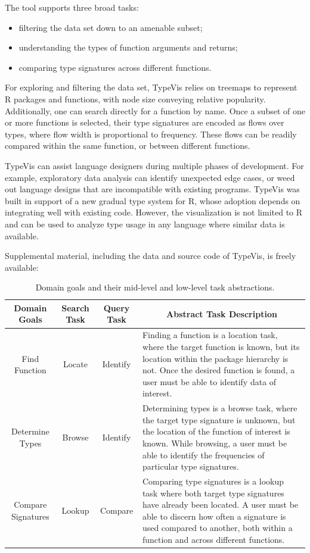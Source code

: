 \documentclass{vgtc}                          %
\newcommand{\typevis}{{\sc TypeVis}\xspace}
\begin{document}
The tool supports three broad tasks:
\begin{itemize}
  \setlength\itemsep{0em}
  \item filtering the data set down to an amenable subset;
  \item understanding the types of function arguments and returns;
  \item comparing type signatures across different functions.
\end{itemize}
For exploring and filtering the data set,
\typevis relies on treemaps to represent R packages and functions,
with node size conveying relative popularity.
Additionally, one can search directly for a function by name.
Once a subset of one or more functions is selected,
their type signatures are encoded as flows over types,
where flow width is proportional to frequency.
These flows can be readily compared within the same function,
or between different functions.

\typevis can assist language designers during multiple phases of development.
For example, exploratory data analysis can identify unexpected edge cases,
or weed out language designs that are incompatible with existing programs.
\typevis was built in support of a new gradual type system for R,
whose adoption depends on integrating well with existing code.
However, the visualization is not limited to R and can be used to
analyze type usage in any language where similar data is available.

Supplemental material, including the data and source code of
\typevis, is freely available: 

\bgroup
\def\arraystretch{1.75}
\begin{table}
  \centering
  \begin{tabularx}{\linewidth}{c|c|c|X}
    Domain Goals & Search Task & Query Task & \multicolumn{1}{c}{Abstract Task Description} \\
    \hline
    Find Function & Locate & Identify & Finding a function is a location task, where the target function is known, but its location within the package hierarchy is not. Once the desired function is found, a user must be able to identify data of interest. \\

    Determine Types & Browse & Identify & Determining types is a browse task, where the target type signature is unknown, but the location of the function of interest is known. While browsing, a user must be able to identify the frequencies of particular type signatures.\\

    Compare Signatures & Lookup & Compare & Comparing type signatures is a lookup task where both target type signatures have already been located. A user must be able to discern how often a signature is used compared to another, both within a function and across different functions.\\
  \end{tabularx}
  \caption{Domain goals and their mid-level and low-level task abstractions.}
  \label{tab:tasks}
\end{table}
\egroup
\end{document}
